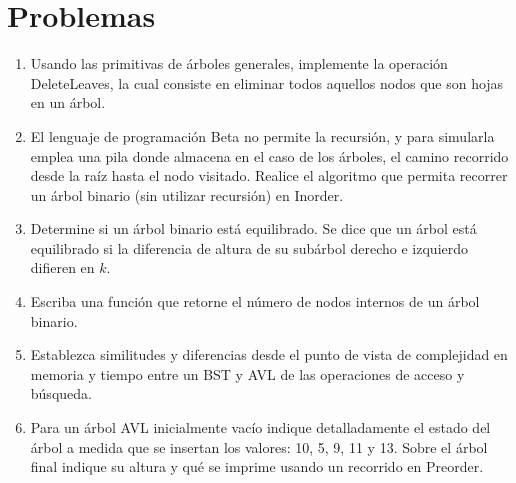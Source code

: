 \section{Problemas}
\begin{enumerate}
\item Usando las primitivas de árboles generales, implemente la operación DeleteLeaves, la cual consiste en eliminar todos aquellos nodos que son hojas en un árbol.
\item El lenguaje de programación Beta no permite la recursión, y para simularla emplea una pila donde almacena en el caso de los árboles, el camino recorrido desde la raíz hasta el nodo visitado. Realice el algoritmo que permita recorrer un árbol binario (sin utilizar recursión) en Inorder.
\item Determine si un árbol binario está equilibrado. Se dice que un árbol está equilibrado si la diferencia de altura de su subárbol derecho e izquierdo difieren en $k$.
\item Escriba una función que retorne el número de nodos internos de un árbol binario.
\item Establezca similitudes y diferencias desde el punto de vista de complejidad en memoria y tiempo entre un BST y AVL de las operaciones de acceso y búsqueda.
\item Para un árbol AVL inicialmente vacío indique detalladamente el estado del árbol a medida que se insertan los valores: 10, 5, 9, 11 y 13. Sobre el árbol final indique su altura y qué se imprime usando un recorrido en Preorder.
\end{enumerate}